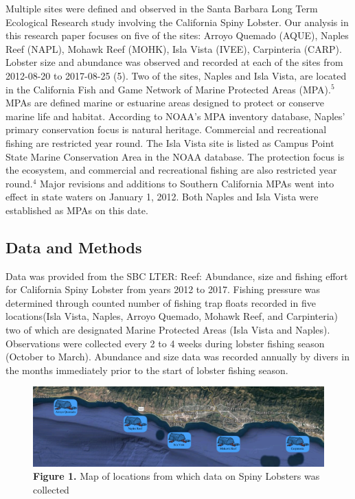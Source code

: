 \documentclass[]{article}
\begin{document}
Multiple sites were defined and observed in the Santa Barbara Long Term
Ecological Research study involving the California Spiny Lobster. Our
analysis in this research paper focuses on five of the sites: Arroyo
Quemado (AQUE), Naples Reef (NAPL), Mohawk Reef (MOHK), Isla Vista
(IVEE), Carpinteria (CARP). Lobster size and abundance was observed and
recorded at each of the sites from 2012-08-20 to 2017-08-25 (5). Two of
the sites, Naples and Isla Vista, are located in the California Fish and
Game Network of Marine Protected Areas (MPA).\(^5\) MPAs are defined
marine or estuarine areas designed to protect or conserve marine life
and habitat. According to NOAA's MPA inventory database, Naples' primary
conservation focus is natural heritage. Commercial and recreational
fishing are restricted year round. The Isla Vista site is listed as
Campus Point State Marine Conservation Area in the NOAA database. The
protection focus is the ecosystem, and commercial and recreational
fishing are also restricted year round.\(^4\) Major revisions and
additions to Southern California MPAs went into effect in state waters
on January 1, 2012. Both Naples and Isla Vista were established as MPAs
on this date.

\subsection{Data and Methods}\label{data-and-methods}

Data was provided from the SBC LTER: Reef: Abundance, size and fishing
effort for California Spiny Lobster from years 2012 to 2017. Fishing
pressure was determined through counted number of fishing trap floats
recorded in five locations(Isla Vista, Naples, Arroyo Quemado, Mohawk
Reef, and Carpinteria) two of which are designated Marine Protected
Areas (Isla Vista and Naples). Observations were collected every 2 to 4
weeks during lobster fishing season (October to March). Abundance and
size data was recorded annually by divers in the months immediately
prior to the start of lobster fishing season.

\begin{figure}
\centering
\includegraphics{lobster_map.png}
\caption{\textbf{Figure 1.} Map of locations from which data on Spiny
Lobsters was collected}
\end{figure}
\end{document}
